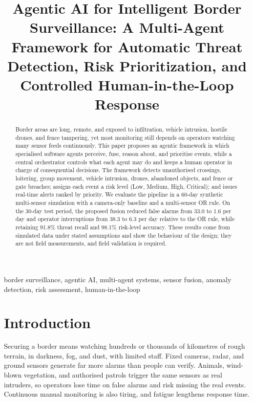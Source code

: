 \documentclass[conference]{IEEEtran}
\begin{document}
\title{Agentic AI for Intelligent Border Surveillance: A Multi-Agent Framework for Automatic Threat Detection, Risk Prioritization, and Controlled Human-in-the-Loop Response}
\author{
}
\maketitle

\begin{abstract}
Border areas are long, remote, and exposed to infiltration, vehicle intrusion, hostile drones, and fence tampering, yet most monitoring still depends on operators watching many sensor feeds continuously. This paper proposes an agentic framework in which specialised software agents perceive, fuse, reason about, and prioritise events, while a central orchestrator controls what each agent may do and keeps a human operator in charge of consequential decisions. The framework detects unauthorised crossings, loitering, group movement, vehicle intrusion, drones, abandoned objects, and fence or gate breaches; assigns each event a risk level (Low, Medium, High, Critical); and issues real-time alerts ranked by priority. We evaluate the pipeline in a 60-day synthetic multi-sensor simulation with a camera-only baseline and a multi-sensor OR rule. On the 30-day test period, the proposed fusion reduced false alarms from 33.0 to 1.6 per day and operator interruptions from 38.3 to 6.3 per day relative to the OR rule, while retaining 91.8\% threat recall and 98.1\% risk-level accuracy. These results come from simulated data under stated assumptions and show the behaviour of the design; they are not field measurements, and field validation is required.
\end{abstract}
\begin{IEEEkeywords}
border surveillance, agentic AI, multi-agent systems, sensor fusion, anomaly detection, risk assessment, human-in-the-loop
\end{IEEEkeywords}

\section{Introduction}
Securing a border means watching hundreds or thousands of kilometres of rough terrain, in darkness, fog, and dust, with limited staff. Fixed cameras, radar, and ground sensors generate far more alarms than people can verify. Animals, wind-blown vegetation, and authorised patrols trigger the same sensors as real intruders, so operators lose time on false alarms and risk missing the real events. Continuous manual monitoring is also tiring, and fatigue lengthens response time.
\end{document}
